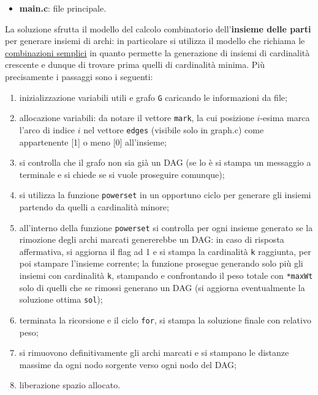 \documentclass[11pt,a4paper]{report}
\begin{document}
\begin{itemize}
\begin{itemize}
	\end{itemize}
	\item\textbf{ main.c}: file principale.
\end{itemize}
	
	La soluzione sfrutta il modello del calcolo combinatorio dell'\textbf{insieme delle parti} per generare insiemi di archi: in particolare si utilizza il modello che richiama le \underline{combinazioni semplici} in quanto permette la generazione di insiemi di cardinalità crescente e dunque di trovare prima quelli di cardinalità minima.
	Più precisamente i passaggi sono i seguenti:
	\begin{enumerate}
		\item inizializzazione variabili utili e grafo \lstinline|G| caricando le informazioni da file;
		\item allocazione variabili: da notare il vettore \lstinline|mark|, la cui posizione $i$-esima marca l'arco di indice $i$ nel vettore \lstinline|edges| (visibile solo in graph.c) come appartenente [1] o meno [0] all'insieme;
		\item si controlla che il grafo non sia già un DAG (se lo è si stampa un messaggio a terminale e si chiede se si vuole proseguire comunque);
		\item si utilizza la funzione \lstinline|powerset| in un opportuno ciclo per generare gli insiemi partendo da quelli a cardinalità minore;
		\item all'interno della funzione \lstinline|powerset| si controlla per ogni insieme generato se la rimozione degli archi marcati genererebbe un DAG: in caso di risposta affermativa, si aggiorna il flag ad 1 e si stampa la cardinalità \lstinline|k| raggiunta, per poi stampare l'insieme corrente; la funzione prosegue generando solo più gli insiemi con cardinalità \lstinline|k|, stampando e confrontando il peso totale con \lstinline|*maxWt| solo di quelli che se rimossi generano un DAG (si aggiorna eventualmente la soluzione ottima \lstinline|sol|);
		\item terminata la ricorsione e il ciclo \lstinline|for|, si stampa la soluzione finale con relativo peso;
		\item si rimuovono definitivamente gli archi marcati e si stampano le distanze massime da ogni nodo sorgente verso ogni nodo del DAG;
		\item liberazione spazio allocato.
	\end{enumerate}
	
\end{document}
